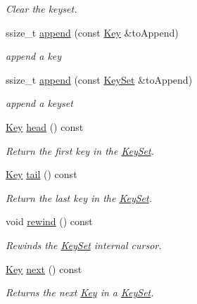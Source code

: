 \begin{DoxyCompactItemize}
\begin{DoxyCompactList}\small\item\em Clear the keyset. \end{DoxyCompactList}\item 
ssize\-\_\-t \hyperlink{classkdb_1_1KeySet_a0d4b2f3aa9f58d10053561135b50233e}{append} (const \hyperlink{classkdb_1_1Key}{Key} \&to\-Append)
\begin{DoxyCompactList}\small\item\em append a key \end{DoxyCompactList}\item 
ssize\-\_\-t \hyperlink{classkdb_1_1KeySet_ac9cbdc933d7171037d47c6d4d78595d1}{append} (const \hyperlink{classkdb_1_1KeySet}{Key\-Set} \&to\-Append)
\begin{DoxyCompactList}\small\item\em append a keyset \end{DoxyCompactList}\item 
\hyperlink{classkdb_1_1Key}{Key} \hyperlink{classkdb_1_1KeySet_ad2b65a3aedad1e495351c770b29cd5c4}{head} () const 
\begin{DoxyCompactList}\small\item\em Return the first key in the \hyperlink{classkdb_1_1KeySet}{Key\-Set}.  \end{DoxyCompactList}\item 
\hyperlink{classkdb_1_1Key}{Key} \hyperlink{classkdb_1_1KeySet_ac6ccd44a29326a0d9a5c2e60d3089b5e}{tail} () const 
\begin{DoxyCompactList}\small\item\em Return the last key in the \hyperlink{classkdb_1_1KeySet}{Key\-Set}.  \end{DoxyCompactList}\item 
void \hyperlink{classkdb_1_1KeySet_a4476a586a48a64160c71ed480c681b19}{rewind} () const 
\begin{DoxyCompactList}\small\item\em Rewinds the \hyperlink{classkdb_1_1KeySet}{Key\-Set} internal cursor.  \end{DoxyCompactList}\item 
\hyperlink{classkdb_1_1Key}{Key} \hyperlink{classkdb_1_1KeySet_a03f115c65cf2720411bb76d5f4e10c25}{next} () const 
\begin{DoxyCompactList}\small\item\em Returns the next \hyperlink{classkdb_1_1Key}{Key} in a \hyperlink{classkdb_1_1KeySet}{Key\-Set}.  \end{DoxyCompactList}\item 

\end{DoxyCompactItemize}
